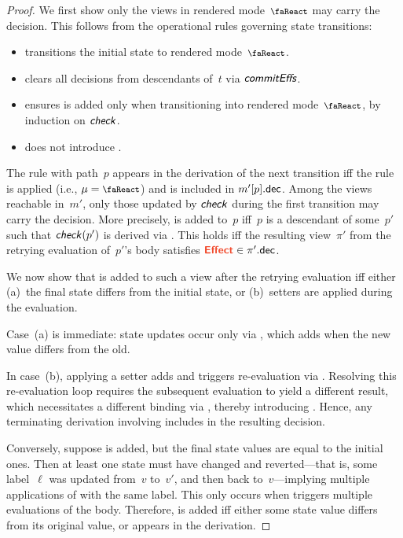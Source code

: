 \begin{proof}
We first show only the views in rendered mode~\(\rendermode\) may carry the  decision. This follows from the operational rules governing state transitions:
\begin{itemize}
  \item {} transitions the initial state to rendered mode~\(\rendermode\).
  \item {} clears all  decisions from descendants of~$t$ via \(\textsf{\textit{commitEffs}}\).
  \item {} ensures  is added only when transitioning into rendered mode~\(\rendermode\), by induction on \(\textsf{\textit{check}}\).
  \item {} does not introduce .
\end{itemize}

The  rule with path~$p$ appears in the derivation of the next transition iff the  rule is applied (i.e., \(\mu = \rendermode\)) and  is included in $m'[p].\textup{\textsf{dec}}$.
Among the views reachable in~$m'$, only those updated by \(\textsf{\textit{check}}\) during the first transition may carry the  decision.
More precisely,  is added to~$p$ iff~$p$ is a descendant of some~$p'$ such that \(\textsf{\textit{check}}(p')\) is derived via .
This holds iff the resulting view~\(\pi'\) from the retrying evaluation of~$p'$'s body satisfies \(\dec{Effect} \in \pi'.\field{dec}\).

We now show that  is added to such a view after the retrying evaluation iff either (a)~the final state differs from the initial state, or (b)~setters are applied during the evaluation.

Case~(a) is immediate: state updates occur only via , which adds  when the new value differs from the old.

In case~(b), applying a setter adds  and triggers re-evaluation via .
Resolving this re-evaluation loop requires the subsequent evaluation to yield a different result, which necessitates a different binding via , thereby introducing .
Hence, any terminating derivation involving  includes  in the resulting decision.

Conversely, suppose  is added, but the final state values are equal to the initial ones.
Then at least one state must have changed and reverted---that is, some label~$\ell$ was updated from~$v$ to~$v'$, and then back to~$v$---implying multiple applications of  with the same label.
This only occurs when  triggers multiple evaluations of the body.
Therefore,  is added iff either some state value differs from its original value, or  appears in the derivation.
\end{proof}


